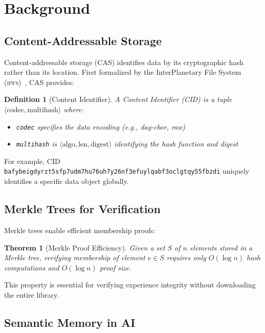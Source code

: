 \documentclass[11pt,letterpaper]{article}
\newtheorem{theorem}{Theorem}[section]
\newtheorem{definition}{Definition}[section]
\newcommand{\IPFS}{\textsc{ipfs}}
\begin{document}
\section{Background}

\subsection{Content-Addressable Storage}

Content-addressable storage (CAS) identifies data by its cryptographic hash rather than its location. First formalized by the InterPlanetary File System (\IPFS{})~\cite{benet2014ipfs}, CAS provides:

\begin{definition}[Content Identifier]
A Content Identifier (CID) is a tuple $\langle \text{codec}, \text{multihash} \rangle$ where:
\begin{itemize}
    \item \texttt{codec} specifies the data encoding (e.g., dag-cbor, raw)
    \item \texttt{multihash} is $\langle \text{algo}, \text{len}, \text{digest} \rangle$ identifying the hash function and digest
\end{itemize}
\end{definition}

For example, CID \texttt{bafybeigdyrzt5sfp7udm7hu76uh7y26nf3efuylqabf3oclgtqy55fbzdi} uniquely identifies a specific data object globally.

\subsection{Merkle Trees for Verification}

Merkle trees enable efficient membership proofs:

\begin{theorem}[Merkle Proof Efficiency]
Given a set $S$ of $n$ elements stored in a Merkle tree, verifying membership of element $e \in S$ requires only $O(\log n)$ hash computations and $O(\log n)$ proof size.
\end{theorem}

This property is essential for verifying experience integrity without downloading the entire library.

\subsection{Semantic Memory in AI}
\end{document}
